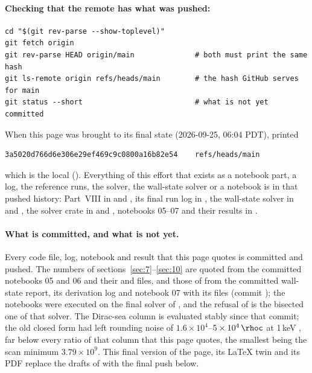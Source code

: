 \paragraph{Checking that the remote has what was pushed:}
\begin{Verbatim}
cd "$(git rev-parse --show-toplevel)"
git fetch origin
git rev-parse HEAD origin/main              # both must print the same hash
git ls-remote origin refs/heads/main        # the hash GitHub serves for main
git status --short                          # what is not yet committed
\end{Verbatim}
When this page was brought to its final state (2026-09-25, 06:04 PDT),  printed
\begin{Verbatim}
3a5020d766d6e306e29ef469c9c0800a16b82e54	refs/heads/main
\end{Verbatim}
which is the local  (). Everything of this effort that exists as a notebook part, a
log, the reference runs, the solver, the wall-state solver or a notebook is in that pushed history: Part~VIII in
 and , its final run log in , the wall-state solver in
 and , the solver crate in  and , notebooks
05--07 and their results in .

\paragraph{What is committed, and what is not yet.} Every code file, log, notebook and result that this page
quotes is committed and pushed. The numbers of sections~\ref{sec:7}--\ref{sec:10} are quoted from the committed
notebooks 05 and 06 and their  and  files, and those of
 from the committed wall-state report, its derivation log and notebook 07 with its
 files (commit ); the notebooks were executed on the final solver of
, and the refusal of  is the bisected one of that solver. The Dirac-sea column
 is evaluated stably since that commit; the old closed form had left rounding noise of
$1.6\times10^{4}$--$5\times10^{4}\,\rhoc$ at 1\,keV , far below every ratio of that column
that this page quotes, the smallest being the scan minimum $3.79\times10^{9}$. This final version of the page,
its LaTeX twin and its PDF replace the drafts of  with the final push below.

